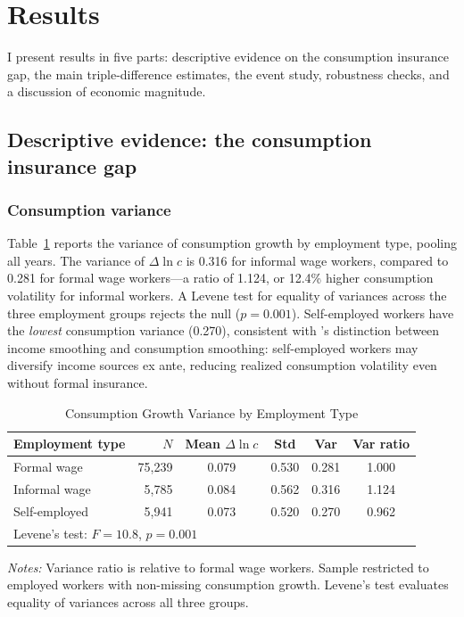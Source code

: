 \documentclass[12pt]{article}
\begin{document}
\section{Results}
\label{sec:results}

I present results in five parts: descriptive evidence on the consumption insurance gap, the main triple-difference estimates, the event study, robustness checks, and a discussion of economic magnitude.

\subsection{Descriptive evidence: the consumption insurance gap}

\subsubsection{Consumption variance}

Table~\ref{tab:cons_variance} reports the variance of consumption growth by employment type, pooling all years. The variance of $\Delta \ln c$ is 0.316 for informal wage workers, compared to 0.281 for formal wage workers---a ratio of 1.124, or 12.4\% higher consumption volatility for informal workers. A Levene test for equality of variances across the three employment groups rejects the null ($p = 0.001$). Self-employed workers have the \textit{lowest} consumption variance (0.270), consistent with \citet{Morduch1995}'s distinction between income smoothing and consumption smoothing: self-employed workers may diversify income sources ex ante, reducing realized consumption volatility even without formal insurance.

\begin{table}[htbp]
\centering
\caption{Consumption Growth Variance by Employment Type}
\label{tab:cons_variance}
\small
\begin{tabular}{lrcccc}
\toprule
Employment type & $N$ & Mean $\Delta \ln c$ & Std & Var & Var ratio \\
\midrule
Formal wage & 75,239 & 0.079 & 0.530 & 0.281 & 1.000 \\
Informal wage & 5,785 & 0.084 & 0.562 & 0.316 & 1.124 \\
Self-employed & 5,941 & 0.073 & 0.520 & 0.270 & 0.962 \\
\midrule
\multicolumn{6}{l}{Levene's test: $F = 10.8$, $p = 0.001$} \\
\bottomrule
\end{tabular}
\begin{minipage}{0.9\textwidth}
\vspace{0.3em}
\footnotesize \textit{Notes:} Variance ratio is relative to formal wage workers. Sample restricted to employed workers with non-missing consumption growth. Levene's test evaluates equality of variances across all three groups.
\end{minipage}
\end{table}
\end{document}
